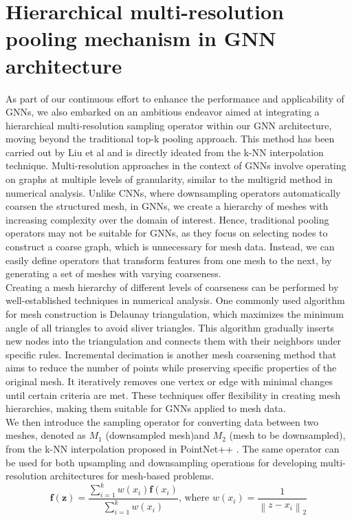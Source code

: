 \section{Hierarchical multi-resolution pooling mechanism in GNN architecture}
As part of our continuous effort to enhance the performance and applicability of GNNs, we also embarked on an ambitious endeavor aimed at integrating a hierarchical multi-resolution sampling operator within our GNN architecture, moving beyond the traditional top-k pooling approach. This method has been carried out by Liu et al \cite{metalearning} and is directly ideated from the k-NN interpolation technique. 
Multi-resolution approaches in the context of GNNs involve operating on graphs at multiple levels of granularity, similar to the multigrid method in numerical analysis. Unlike CNNs, where downsampling operators automatically coarsen the structured mesh, in GNNs, we create a hierarchy of meshes with increasing complexity over the domain of interest. Hence, traditional pooling operators may not be suitable for GNNs, as they focus on selecting nodes to construct a coarse graph, which is unnecessary for mesh data. Instead, we can easily define operators that transform features from one mesh to the next, by generating a set of meshes with varying coarseness.\\
Creating a mesh hierarchy of different levels of coarseness can be performed by well-established techniques in numerical analysis. One commonly used algorithm for mesh construction is Delaunay triangulation, which maximizes the minimum angle of all triangles to avoid sliver triangles. This algorithm gradually inserts new nodes into the triangulation and connects them with their neighbors under specific rules. Incremental decimation is another mesh coarsening method that aims to reduce the number of points while preserving specific properties of the original mesh. It iteratively removes one vertex or edge with minimal changes until certain criteria are met. These techniques offer flexibility in creating mesh hierarchies, making them suitable for GNNs applied to mesh data.\\
We then introduce the sampling operator for converting data between two meshes, denoted as $M_1$ (downsampled mesh)and $M_2$ (mesh to be downsampled), from the k-NN interpolation proposed in PointNet++ \cite{pnpp}. The same operator can be used for both upsampling and downsampling operations for developing multi-resolution architectures for mesh-based problems. \\
\begin{equation}
    \mathbf{f}(\mathbf{z})=\frac{\sum_{i=1}^k w\left(x_i\right) \mathbf{f}\left(x_i\right)}{\sum_{i=1}^k w\left(x_i\right)} \text {, where } w\left(x_i\right)=\frac{1}{\left\|z-x_i\right\|_2}
    \end{equation}

